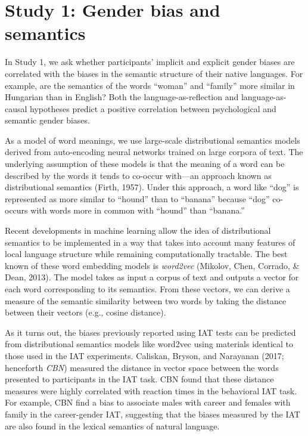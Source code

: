 \documentclass[man,floatsintext]{apa6}
\theoremstyle{definition}
\theoremstyle{definition}
\theoremstyle{definition}
\theoremstyle{remark}
\begin{document}
\section{Study 1: Gender bias and
semantics}\label{study-1-gender-bias-and-semantics}

In Study 1, we ask whether participants' implicit and explicit gender
biases are correlated with the biases in the semantic structure of their
native languages. For example, are the semantics of the words
\enquote{woman} and \enquote{family} more similar in Hungarian than in
English? Both the language-as-reflection and language-as-causal
hypotheses predict a positive correlation between psychological and
semantic gender biases.

As a model of word meanings, we use large-scale distributional semantics
models derived from auto-encoding neural networks trained on large
corpora of text. The underlying assumption of these models is that the
meaning of a word can be described by the words it tends to co-occur
with---an approach known as distributional semantics (Firth, 1957).
Under this approach, a word like \enquote{dog} is represented as more
similar to \enquote{hound} than to \enquote{banana} because
\enquote{dog} co-occurs with words more in common with \enquote{hound}
than \enquote{banana.}

Recent developments in machine learning allow the idea of distributional
semantics to be implemented in a way that takes into account many
features of local language structure while remaining computationally
tractable. The best known of these word embedding models is
\emph{word2vec} (Mikolov, Chen, Corrado, \& Dean, 2013). The model takes
as input a corpus of text and outputs a vector for each word
corresponding to its semantics. From these vectors, we can derive a
measure of the semantic similarity between two words by taking the
distance between their vectors (e.g., cosine distance).

As it turns out, the biases previously reported using IAT tests can be
predicted from distributional semantics models like word2vec using
materials identical to those used in the IAT experiments. Caliskan,
Bryson, and Narayanan (2017; henceforth \emph{CBN}) measured the
distance in vector space between the words presented to participants in
the IAT task. CBN found that these distance measures were highly
correlated with reaction times in the behavioral IAT task. For example,
CBN find a bias to associate males with career and females with family
in the career-gender IAT, suggesting that the biases measured by the IAT
are also found in the lexical semantics of natural language.
\end{document}
